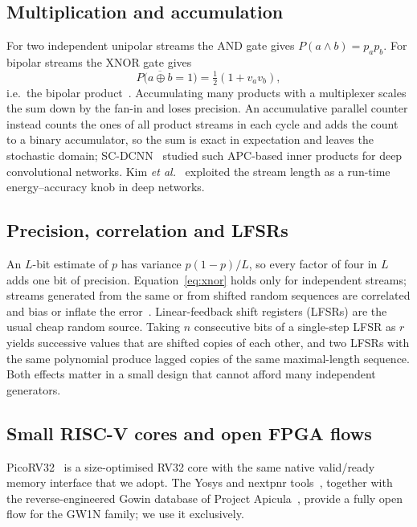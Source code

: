 \documentclass[conference]{IEEEtran}
\begin{document}
\subsection{Multiplication and accumulation}
For two independent unipolar streams the AND gate gives $P(a\wedge b)=p_ap_b$.
For bipolar streams the XNOR gate gives
\begin{equation}
  P\big(\overline{a\oplus b}=1\big) = \tfrac{1}{2}\left(1 + v_a v_b\right),
  \label{eq:xnor}
\end{equation}
i.e.\ the bipolar product~\cite{brown2001stochastic,alaghi2013survey}.
Accumulating many products with a multiplexer scales the sum down by the fan-in
and loses precision. An accumulative parallel counter instead counts the ones
of all product streams in each cycle and adds the count to a binary
accumulator, so the sum is exact in expectation and leaves the stochastic
domain; SC-DCNN~\cite{ren2017scdcnn} studied such APC-based inner products for
deep convolutional networks. Kim \emph{et al.}~\cite{kim2016dynamic} exploited
the stream length as a run-time energy--accuracy knob in deep networks.

\subsection{Precision, correlation and LFSRs}
An $L$-bit estimate of $p$ has variance $p(1-p)/L$, so every factor of four in
$L$ adds one bit of precision. Equation~\eqref{eq:xnor} holds only for
independent streams; streams generated from the same or from shifted random
sequences are correlated and bias or inflate the error~\cite{alaghi2013survey}.
Linear-feedback shift registers (LFSRs) are the usual cheap random source.
Taking $n$ consecutive bits of a single-step LFSR as $r$ yields successive
values that are shifted copies of each other, and two LFSRs with the same
polynomial produce lagged copies of the same maximal-length sequence. Both
effects matter in a small design that cannot afford many independent
generators.

\subsection{Small RISC-V cores and open FPGA flows}
PicoRV32~\cite{wolf_picorv32} is a size-optimised RV32 core with the same
native valid/ready memory interface that we adopt. The Yosys and nextpnr
tools~\cite{shah2019yosysnextpnr,yosys}, together with the reverse-engineered
Gowin database of Project Apicula~\cite{apicula}, provide a fully open flow for
the GW1N family; we use it exclusively.
\end{document}
